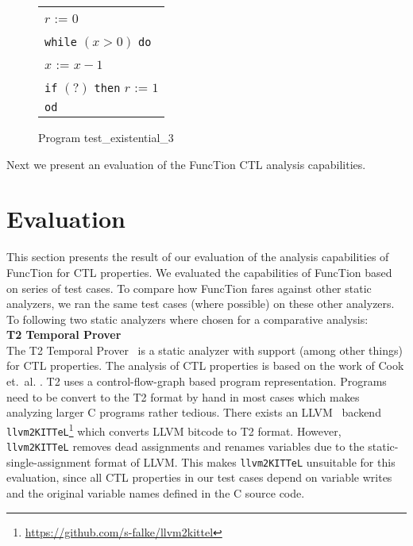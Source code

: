 \documentclass[11pt,a4paper,titlepage]{article}
\theoremstyle{definition}
\begin{document}
\begin{figure}
    \begin{center}
        \begin{tabular}{l}
            $r$ := $0$ \\
            \texttt{while} $(x > 0)$ \texttt{do} \\
            \hspace{1em}$x$ := $x - 1$ \\
            \hspace{1em}\texttt{if} $(?)$ \texttt{then} $r$ := $1$ \\
            \texttt{od}
        \end{tabular}
    \end{center}
    \vspace{-1em}
    \caption{Program \textsf{test\_existential\_3}}
    \label{fig:test_existential_3}
\end{figure}


Next we present an evaluation of the FuncTion CTL analysis capabilities. 

\section{Evaluation}\label{sec:evaluation}

This section presents the result of our evaluation of the analysis capabilities of FuncTion for CTL properties. 
We evaluated the capabilities of FuncTion based on series of test cases. To compare how FuncTion fares against other
static analyzers, we ran the same test cases (where possible) on these other analyzers. 
To following two static analyzers where chosen for a comparative analysis:\\


\textbf{T2 Temporal Prover}\\
The T2 Temporal Prover~\cite{DBLP:conf/tacas/BrockschmidtCIK16} is a static analyzer with support (among other things) for CTL properties.
The analysis of CTL properties is based on the work of Cook et.\ al. \cite{DBLP:journals/fmsd/CookKV12}. T2 uses a control-flow-graph based
program representation. Programs need to be convert to the T2 format by hand in most cases which makes analyzing larger C programs rather tedious.
There exists an LLVM~\cite{Lattner:2004:LCF:977395.977673}
backend \texttt{llvm2KITTeL}\footnote{\url{https://github.com/s-falke/llvm2kittel}} which converts LLVM bitcode to T2 format. 
However, \texttt{llvm2KITTeL} removes dead assignments and renames variables due to the static-single-assignment format of LLVM. 
This makes \texttt{llvm2KITTeL} unsuitable for this evaluation, since all CTL properties in our test cases depend on variable writes and 
the original variable names defined in the C source code.\\
\end{document}
